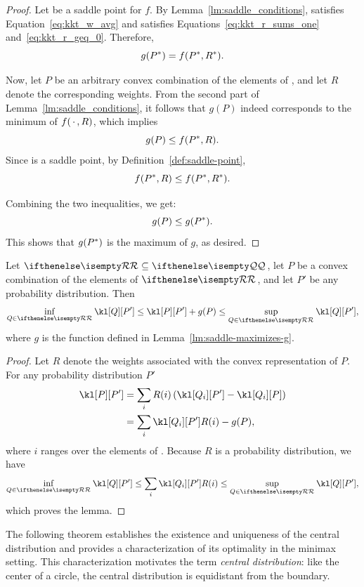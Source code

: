 \begin{proof}
    Let \saddle be a saddle point for $f$.
    By Lemma~\ref{lm:saddle_conditions}, \saddP satisfies Equation~\ref{eq:kkt_w_avg} and \saddR satisfies
    Equations~\ref{eq:kkt_r_sums_one} and~\ref{eq:kkt_r_geq_0}.
    Therefore,
    \[
        g(P^{*}) = f(P^{*}, R^{*}).
    \]

    Now, let $P$ be an arbitrary convex combination of the elements of \setQ, and let $R$ denote the corresponding
    weights.
    From the second part of Lemma~\ref{lm:saddle_conditions}, it follows that $g(P)$ indeed corresponds to the
    minimum of $f(\, \cdot \,, R)$, which implies
    \[
        g(P) \leq f(P^{*},R).
    \]
    Since \saddle is a saddle point, by Definition~\ref{def:saddle-point},
    \[
        f(P^{*}, R) \leq f(P^{*}, R^{*}).
    \]

    Combining the two inequalities, we get:
    \[
        g(P) \leq g(P^{*}).
    \]
    This shows that $g(P^{*})$ is the maximum of $g$, as desired.
\end{proof}

\begin{lemma} \label{lm:kl-bound}
    Let $\set{R} \subseteq \setQ$, let $P$ be a convex combination of the elements of $\set{R}$, and
    let $P'$ be any probability distribution.
    Then
    \begin{equation*}
        \inf_{\inSet{R}} \kl[Q][P'] \leq \kl[P][P'] + g(P) \leq \sup_{\inSet{R}} \kl[Q][P'],
    \end{equation*}
    where $g$ is the function defined in Lemma~\ref{lm:saddle-maximizes-g}.
\end{lemma}

\begin{proof}
    Let $R$ denote the weights associated with the convex representation of $P$.
    For any probability distribution $P'$
    \begin{align*}
        \kl[P][P']
        &= \sum_i R(i)\left(\kl[Q_i][P'] - \kl[Q_i][P] \right) \\
        \nonumber
        &= \sum_i \kl[Q_i][P']R(i) - g(P),
    \end{align*}
    where $i$ ranges over the elements of .
    Because $R$ is a probability distribution, we have
    \[
        \inf_{\inSet{R}} \kl[Q][P'] \leq \sum_i \kl[Q_i][P']R(i) \leq \sup_{\inSet{R}} \kl[Q][P'],
    \]
    which proves the lemma.
\end{proof}

The following theorem establishes the existence and uniqueness of the central distribution and provides a
characterization of its optimality in the minimax setting.
This characterization motivates the term \emph{central distribution}:
like the center of a circle, the central distribution is equidistant from the boundary.

